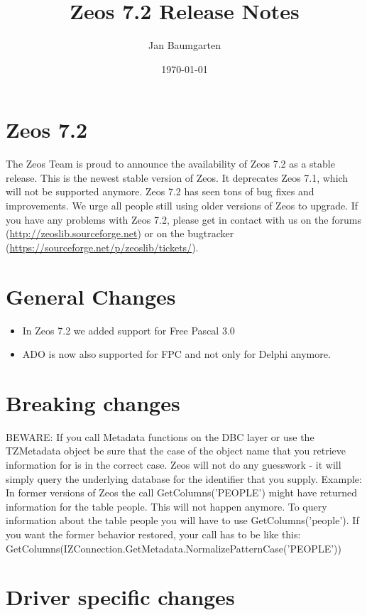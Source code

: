 \documentclass[a4paper,12pt,oneside]{article}
\title{Zeos 7.2 Release Notes}
\author{Jan Baumgarten}
\date{\today}
\begin{document}
\maketitle

\section{Zeos 7.2}
The Zeos Team is proud to announce the availability of Zeos 7.2 as a stable release.
This is the newest stable version of Zeos.
It deprecates Zeos 7.1, which will not be supported anymore.
Zeos 7.2 has seen tons of bug fixes and improvements.
We urge all people still using older versions of Zeos to upgrade.
If you have any problems with Zeos 7.2, please get in contact with us on the forums (\url{http://zeoslib.sourceforge.net}) or on the bugtracker (\url{https://sourceforge.net/p/zeoslib/tickets/}).

\section{General Changes}
\begin{itemize}
\item In Zeos 7.2 we added support for Free Pascal 3.0
\item ADO is now also supported for FPC and not only for Delphi anymore.
\end{itemize}

\section{Breaking changes}
BEWARE: If you call Metadata functions on the DBC layer or use the TZMetadata object be sure that the case of the object name that you retrieve information for is in the correct case.
Zeos will not do any guesswork - it will simply query the underlying database for the identifier that you supply.
Example: In former versions of Zeos the call GetColumns('PEOPLE') might have returned information for the table people.
This will not happen anymore.
To query information about the table people you will have to use GetColumns('people').
If you want the former behavior restored, your call has to be like this:\\
GetColumns(\-IZConnection.\-GetMetadata.\-NormalizePatternCase('PEOPLE'))

\section{Driver specific changes}
\end{document}
